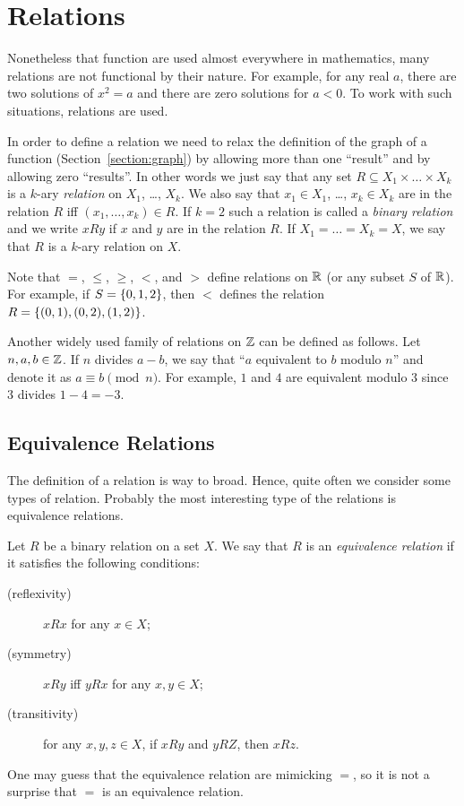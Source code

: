 \chapter{Relations}
\label{chapter:relations}
Nonetheless that function are used almost everywhere in mathematics, many
relations are not functional by their nature. For example, for any real
$a$, there are two solutions of $x^2 = a$ and there are zero solutions for
$a < 0$. To work with such situations, relations are used.

In order to define a relation we need to relax the definition of the graph of a
function (Section~\ref{section:graph}) by allowing more than one ``result'' and
by allowing zero ``results''. In other words we just say that any set $R
\subseteq X_1 \times \dots \times X_k$ is a $k$-ary \emph{relation} on $X_1$,
\dots, $X_k$. We also say that $x_1 \in X_1$, \dots, $x_k \in X_k$ are in the
relation $R$ iff $(x_1, \dots, x_k) \in R$. If $k = 2$ such a relation is
called a \emph{binary relation} and we write $x R y$ if $x$ and $y$ are in
the relation $R$. If $X_1 = \dots = X_k = X$, we say that $R$ is a $k$-ary
relation on $X$.

Note that $=$, $\le$, $\ge$, $<$, and $>$ define relations on $\mathbb{R}$ (or any
subset $S$ of $\mathbb{R}$). For example, if $S = \set{0, 1, 2}$, then $<$ defines
the relation $R = \set{(0, 1), (0, 2), (1, 2)}$.

Another widely used family of relations on $\mathbb{Z}$ can be defined as follows. Let
$n, a, b \in \mathbb{Z}$. If $n$ divides $a - b$, we say that
``$a$ equivalent to $b$ modulo $n$'' and denote it as $a \equiv b \pmod{n}$.
For example, $1$ and $4$ are equivalent modulo $3$ since $3$ divides
$1 - 4 = -3$.

\section{Equivalence Relations}
The definition of a relation is way to broad. Hence, quite often we consider
some types of relation. Probably the most interesting type of the relations is
equivalence relations.

\begin{definition}
  Let $R$ be a binary relation on a set $X$. We say that $R$ is an
  \emph{equivalence relation} if it satisfies the following conditions:
  \begin{description}
    \item[(reflexivity)] $x R x$ for any $x \in X$;
    \item[(symmetry)] $x R y$ iff $y R x$ for any $x, y \in X$;
    \item[(transitivity)] for any $x, y, z \in X$, if $x R y$ and $y R Z$,
      then $x R z$.
  \end{description}
\end{definition}
One may guess that the equivalence relation are mimicking $=$, so it is not a
surprise that $=$ is an equivalence relation.

